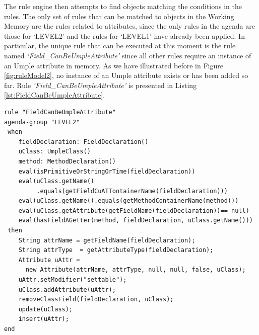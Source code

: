 The rule engine then attempts to find objects matching the conditions in the rules. The only set of rules that can be matched to objects in the Working Memory are the rules related to attributes, since the only rules in the agenda are those for `LEVEL2' and the rules for `LEVEL1' have already been applied. In particular, the unique rule
that can be executed at this moment is the rule named \textit{`Field\_CanBeUmpleAttribute'} since all other rules require an instance of an Umple attribute in memory. As we have illustrated before in Figure \ref{fig:ruleModel2}, no instance of an Umple attribute exists or has been added so far. Rule \textit{`Field\_CanBeUmpleAttribute'} is presented in Listing \ref{lst:FieldCanBeUmpleAttribute}.

\begin{lstlisting}[language={drools},label=lst:FieldCanBeUmpleAttribute, caption=Rule  FieldCanBeUmpleAttribute]
rule "FieldCanBeUmpleAttribute"
agenda-group "LEVEL2" 
 when
	fieldDeclaration: FieldDeclaration()
	uClass: UmpleClass()
	method: MethodDeclaration()
	eval(isPrimitiveOrStringOrTime(fieldDeclaration))				   
	eval(uClass.getName()
	     .equals(getFieldCuATTontainerName(fieldDeclaration)))
	eval(uClass.getName().equals(getMethodContainerName(method)))
	eval(uClass.getAttribute(getFieldName(fieldDeclaration))== null)
	eval(hasFieldAGetter(method, fieldDeclaration, uClass.getName()))
 then 
	String attrName = getFieldName(fieldDeclaration);
	String attrType  = getAttributeType(fieldDeclaration);
	Attribute uAttr = 
	  new Attribute(attrName, attrType, null, null, false, uClass);
	uAttr.setModifier("settable");
	uClass.addAttribute(uAttr);
	removeClassField(fieldDeclaration, uClass);
	update(uClass);    	
	insert(uAttr);
end
\end{lstlisting}

